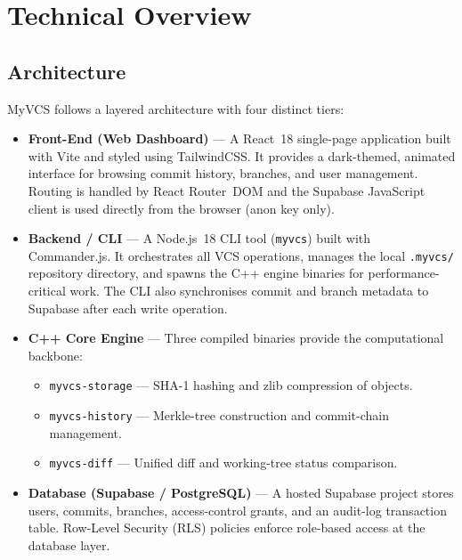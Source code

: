 \documentclass{article}
\begin{document}
\section{Technical Overview}

\subsection{Architecture}

MyVCS follows a layered architecture with four distinct tiers:

\begin{itemize}
    \item \textbf{Front-End (Web Dashboard)} --- A React~18 single-page
          application built with Vite and styled using TailwindCSS.  It
          provides a dark-themed, animated interface for browsing commit
          history, branches, and user management.  Routing is handled by
          React Router~DOM and the Supabase JavaScript client is used
          directly from the browser (anon key only).

    \item \textbf{Backend / CLI} --- A Node.js~18 CLI tool
          (\texttt{myvcs}) built with Commander.js.  It orchestrates all
          VCS operations, manages the local \texttt{.myvcs/} repository
          directory, and spawns the C++ engine binaries for
          performance-critical work.  The CLI also synchronises commit
          and branch metadata to Supabase after each write operation.

    \item \textbf{C++ Core Engine} --- Three compiled binaries provide
          the computational backbone:
          \begin{itemize}
              \item \texttt{myvcs-storage} --- SHA-1 hashing and zlib
                    compression of objects.
              \item \texttt{myvcs-history} --- Merkle-tree construction
                    and commit-chain management.
              \item \texttt{myvcs-diff} --- Unified diff and working-tree
                    status comparison.
          \end{itemize}

    \item \textbf{Database (Supabase / PostgreSQL)} --- A hosted
          Supabase project stores users, commits, branches,
          access-control grants, and an audit-log transaction table.
          Row-Level Security (RLS) policies enforce role-based access at
          the database layer.
\end{itemize}
\end{document}
